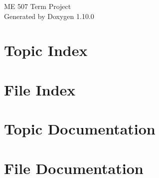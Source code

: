 \documentclass[twoside]{book}
\newcommand{\+}{\discretionary{\mbox{\scriptsize$\hookleftarrow$}}{}{}}
\newcommand{\clearemptydoublepage}{%
    \newpage{\pagestyle{empty}\cleardoublepage}%
  }
\begin{document}
  \raggedbottom
    \hypersetup{pageanchor=false,
                bookmarksnumbered=true,
                pdfencoding=unicode
               }
  \begin{titlepage}
  \vspace*{7cm}
  \begin{center}%
  {\Large ME 507 Term Project}\\
  \vspace*{1cm}
  {\large Generated by Doxygen 1.10.0}\\
  \end{center}
  \end{titlepage}
  \clearemptydoublepage
  \tableofcontents
  \clearemptydoublepage
  \hypersetup{pageanchor=true}
\chapter{Topic Index}

\chapter{File Index}

\chapter{Topic Documentation}

\chapter{File Documentation}






  \backmatter
  \newpage
  \clearemptydoublepage
  \printindex
\end{document}
